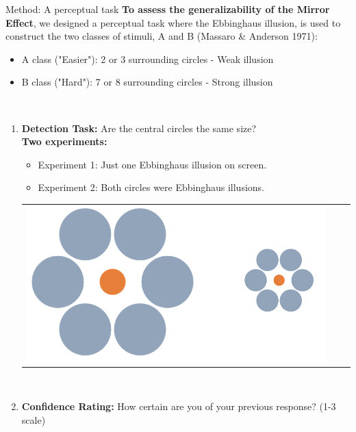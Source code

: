 \documentclass[final]{beamer}
\newlength{\onecolwid}
\begin{document}
\begin{frame}[t]
\begin{columns}[t]
\begin{column}{\onecolwid}
\begin{alertblock}{Method: A perceptual task}
\textbf{To assess the generalizability of the Mirror Effect}, we designed a perceptual task where  the Ebbinghaus illusion, is used to construct the two classes of stimuli, A and B (Massaro \& Anderson  1971):
\begin{itemize}
\item A class ("Easier"): 2 or 3 surrounding circles - Weak illusion
\item B class ("Hard"): 7 or 8 surrounding circles - Strong illusion
\end{itemize}
$\quad$\\
\begin{enumerate}
\item \textbf{Detection Task:} Are the central circles the same size?\\
\textbf{Two experiments:} 
\begin{itemize}
\item Experiment 1: Just one Ebbinghaus illusion on screen.
\item Experiment 2: Both circles were Ebbinghaus illusions.\\
\end{itemize}
\begin{center}
\begin{tabular}{ccc}
\includegraphics[width=0.35\linewidth]{Figures/MainTask3.png}
\end{tabular}
\end{center}
$\quad$\\
\item \textbf{Confidence Rating:} How certain are you of your previous response? (1-3 scale)
\end{enumerate}
\end{alertblock}



\end{column}
\end{columns}
\end{frame}
\end{document}
